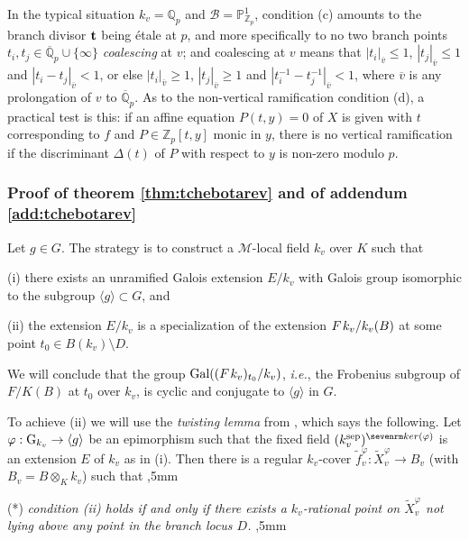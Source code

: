 \documentclass[12pt,english]{amsart}
\newtheorem{twisting lemma}[theorem]{Twisting lemma}
\begin{document}
In the typical situation $k_v={\mathbb{Q}}_p$ and ${\mathcal B} = {\mathbb{P}}^1_{{\mathbb{Z}}_p}$, condition (c) amounts to the branch divisor ${\bf t}$ being \'etale at $p$, and more specifically to no two  branch points $t_i,t_j \in {\overline {\mathbb{Q}}_p} \cup \{\infty\}$ \textit{coalescing} at $v$; and coalescing at $v$ means that $|t_i|_{\overline v} \le 1$, $|t_j|_{\overline v} \le 1$ and $|t_i-t_j|_{\overline v} < 1$, or else $|t_i|_{\overline v} \ge 1$, $|t_j|_{\overline v} \ge 1$ and $|t_i^{-1}-t_j^{-1}|_{\overline v} < 1$, where $\overline v$ is any prolongation of $v$ to ${\overline {\mathbb{Q}}_p}$.  As to the non-vertical ramification condition (d), a practical test is this:  if an affine equation $P(t,y)=0$ of $X$ is given with $t$ corresponding to $f$ and $P\in {\mathbb{Z}}_p[t,y]$ monic in $y$, there is no vertical ramification if the discriminant $\Delta(t)$ of $P$ with respect to $y$ is non-zero modulo $p$.

\subsubsection{Proof of theorem \ref{thm:tchebotarev} and of addendum \ref{add:tchebotarev}}
\label{ssec:proofs}
Let $g\in G$. The strategy is to construct a ${\mathcal M}$-local field $k_v$ over $K$ such that 

\noindent
(i) there exists an unramified Galois extension $E/k_v$ with Galois group isomorphic to the subgroup $\langle g\rangle \subset G$, and 

\noindent
(ii) the extension $E/k_v$ is a specialization of the extension $F\hskip 1ptk_v/k_v(B)$ at some point $t_0 \in B(k_v)\setminus D$. 

\noindent
We will conclude that the group ${\hbox{\rm Gal}}((F\hskip 1pt k_v)_{t_0}/k_v)$, {\it i.e.}, the Frobenius subgroup of $F/K(B)$ at $t_0$ over $k_v$, is cyclic and conjugate to $\langle g \rangle$ in $G$.

To achieve (ii) we will use the {\it twisting lemma} from \cite{DEGha}, which says the following. Let $\varphi: {\hbox{\rm G}}_{k_v} \rightarrow \langle g\rangle$ be an epimorphism such that the fixed field $(k_v^{{\scriptsize\hbox{\rm sep}}})^{{\sevenrm ker}(\varphi)}$ is an extension $E$ of $k_v$ as in (i). Then there is a regular
$k_v$-cover $\widetilde f^{\varphi}_v: \widetilde X_v^{\varphi} \rightarrow B_v$ (with $B_v=B\otimes_K k_v$) such that 
,5mm

\noindent
(*) {\it condition {\rm (ii)} holds if and only if there exists a $k_v$-rational point on $\widetilde X_v^{\varphi}$ not lying above any point in the branch locus $D$.}
,5mm
\end{document}
